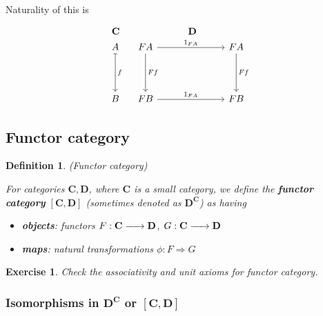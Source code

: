 \documentclass{article}
\newtheorem{definition}{Definition}[section]
\newtheorem{exercise}{Exercise}[section]
\renewcommand{\to}{\xrightarrow{\hspace{0.5cm}}}  %
\begin{document}
    Naturality of this is

    \[
        \begin{array}{c c} %
            \mathbf{C} & \mathbf{D} \\
            \begin{tikzcd}[column sep=4em, row sep=4em]
                A \arrow[d, mapsto, "f"] \\
                B
            \end{tikzcd}
            &
            \begin{tikzcd}[column sep=7em, row sep=4em]
                FA \arrow[r, "1_{FA}"] \arrow[d, "Ff"]
                & FA \arrow[d, "Ff"] \\
                FB\arrow[r, "1_{FA}"]
                & FB
            \end{tikzcd}
        \end{array}
    \]

    \subsection{Functor category}

    \begin{definition} (Functor category)


        For categories \(\mathbf{C}, \mathbf{D}\), where \(\mathbf{C}\) is a small category, we define the \textbf{functor category} \([\mathbf{C}, \mathbf{D}]\)
        (sometimes denoted as \(\mathbf{D}^{\mathbf{C}}\)) as having

        \begin{itemize}
            \item \textbf{objects}: functors \(F: \mathbf{C} \to \mathbf{D}\), \(G: \mathbf{C} \to \mathbf{D}\)
            \item \textbf{maps}: natural transformations \(\phi: F \Rightarrow G\)
        \end{itemize}
    \end{definition}

    \vspace{0.2in}

    \begin{exercise}
        Check the associativity and unit axioms for functor category.
    \end{exercise}

    \newpage

    \subsubsection{Isomorphisms in \(\mathbf{D}^{\mathbf{C}}\) or \([\mathbf{C}, \mathbf{D}]\)}
\end{document}
